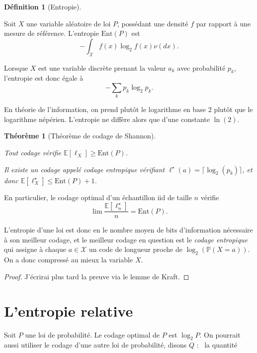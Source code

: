 \documentclass[
  10,
  letterpaper,
  DIV=11,
  numbers=noendperiod]{scrreport}
\newcommand{\ent}{\mathrm{Ent}}
\theoremstyle{plain}
\newtheorem{theorem}{Théorème}[chapter]
\theoremstyle{definition}
\theoremstyle{plain}
\theoremstyle{definition}
\newtheorem{definition}{Définition}[chapter]
\theoremstyle{definition}
\theoremstyle{plain}
\theoremstyle{remark}
\begin{document}
\begin{definition}[Entropie]\protect\hypertarget{def-entropie}{}\label{def-entropie}

Soit \(X\) une variable aléatoire de loi \(P\), possédant une densité
\(f\) par rapport à une mesure de référence. L'entropie \(\ent(P)\) est
\[ - \int_{\mathcal{X}}f(x)\log_2 f(x)\nu(dx).\]

\end{definition}

Lorsque \(X\) est une variable discrète prenant la valeur \(a_k\) avec
probabilité \(p_k\), l'entropie est donc égale à
\[ -\sum_{k} p_k \log_2 p_k.\]

En théorie de l'information, on prend plutôt le logarithme en base 2
plutôt que le logarithme népérien. L'entropie ne diffère alors que d'une
constante \(\ln(2)\).

\begin{theorem}[Théorème de codage de
Shannon]\protect\hypertarget{thm-shannon}{}\label{thm-shannon}

Tout codage vérifie \(\mathbb{E}[\ell_X]\geqslant \ent(P)\).

Il existe un codage appelé \emph{codage entropique} vérifiant
\(\ell^\star(a)=\lceil \log_2(p_k)\rceil\), et donc
\(\mathbb{E}[\ell^\star_X]\leqslant \ent(P)+1\).

\end{theorem}

En particulier, le codage optimal d'un échantillon iid de taille \(n\)
vérifie \[ \lim \frac{\mathbb{E}[\ell^\star_n]}{n} = \ent(P).\]

L'entropie d'une loi est donc en le nombre moyen de bits d'information
nécessaire à son meilleur codage, et le meilleur codage en question est
le \emph{codage entropique} qui assigne à chaque \(a \in \mathcal{X}\)
un code de longueur proche de \(\log_2(\mathbb{P}(X=a))\). On a donc
compressé au mieux la variable \(X\).

\begin{proof}

J'écrirai plus tard la preuve via le lemme de Kraft.

\end{proof}

\hypertarget{lentropie-relative}{%
\section{L'entropie relative}\label{lentropie-relative}}

Soit \(P\) une loi de probabilité. Le codage optimal de \(P\) est
\(\log_2 P\). On pourrait aussi utiliser le codage d'une autre loi de
probabilité, disons \(Q\) :~ la quantité
\end{document}

